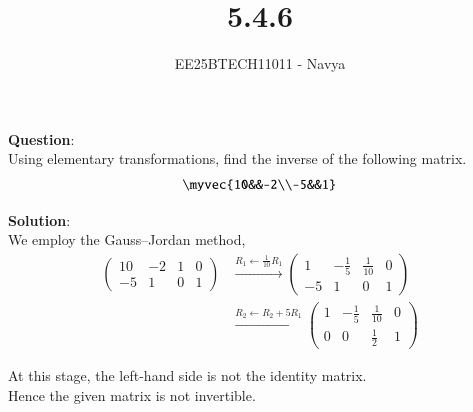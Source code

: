 \documentclass[journal]{IEEEtran}
\begin{document}

\vspace{3cm}

\title{5.4.6}
\author{EE25BTECH11011 - Navya}
{\let\newpage\relax\maketitle}

\renewcommand{\thefigure}{\theenumi}
\renewcommand{\thetable}{\theenumi}
\setlength{\intextsep}{10pt} %
\textbf{Question}:\\
Using elementary transformations, find the inverse of the following matrix. 
\begin{align*}
    \myvec{10&&-2\\-5&&1}
\end{align*}

\textbf{Solution}:\\ 
We employ the Gauss--Jordan method,
\begin{align}
\left(\begin{array}{cc|cc}
10 & -2 & 1 & 0 \\
-5 & 1 & 0 & 1
\end{array}\right)
&\xrightarrow{R_1 \leftarrow \tfrac{1}{10}R_1}
\left(\begin{array}{cc|cc}
1 & -\tfrac{1}{5} & \tfrac{1}{10} & 0 \\
-5 & 1 & 0 & 1
\end{array}\right) \\[1em]
&\xrightarrow{R_2 \leftarrow R_2+5R_1}
\left(\begin{array}{cc|cc}
1 & -\tfrac{1}{5} & \tfrac{1}{10} & 0 \\
0 & 0 & \tfrac{1}{2} & 1
\end{array}\right)
\end{align}

At this stage, the left-hand side is not the identity matrix. \\
Hence the given matrix is not invertible.
\end{document}
